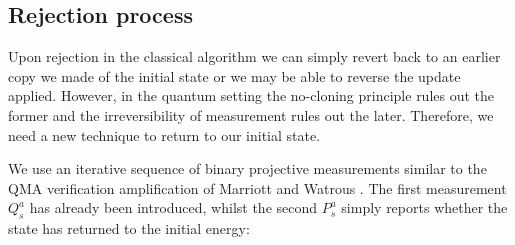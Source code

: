 \documentclass[aps,floatfix,10pt,amssymb,amsfont,amsmath,superscriptaddress,float,nofootinbib,longbibliography,nobalancelastpage,twocolumn]{revtex4-2}
\begin{document}
\subsection{Rejection process}
Upon rejection in the classical algorithm we can simply revert back to an earlier copy we made of the initial state or we may be able to reverse the update applied. However, in the quantum setting the no-cloning principle rules out the former and the irreversibility of measurement rules out the later. Therefore, we need a new technique to return to our initial state.

We use an iterative sequence of binary projective measurements similar to the QMA verification amplification of Marriott and Watrous \cite{MarriottWatrous}. The first measurement $Q_s^a$ has already been introduced, whilst the second $P_s^a$ simply reports whether the state has returned to the initial energy:
\end{document}
